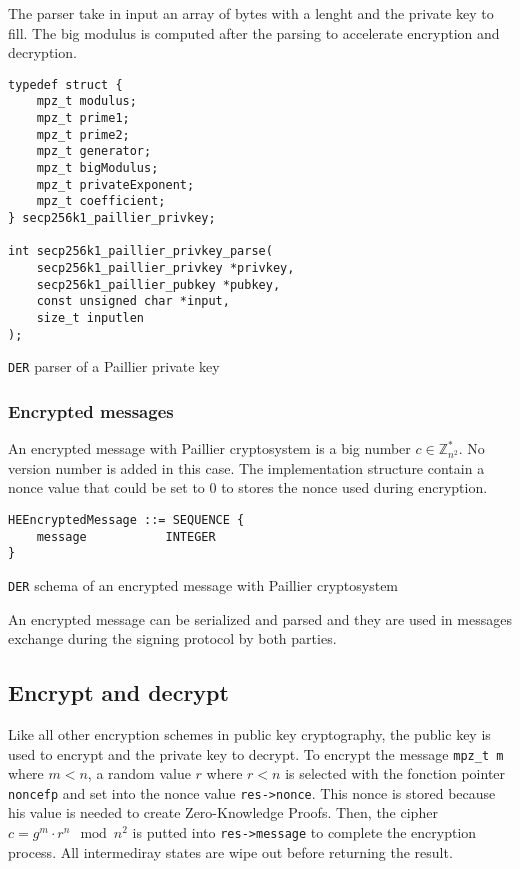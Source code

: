 The parser take in input an array of bytes with a lenght and the private key to fill.
The big modulus is computed after the parsing to accelerate encryption and decryption.

\begin{listing}
  \begin{verbatim}
typedef struct {
    mpz_t modulus;
    mpz_t prime1;
    mpz_t prime2;
    mpz_t generator;
    mpz_t bigModulus;
    mpz_t privateExponent;
    mpz_t coefficient;
} secp256k1_paillier_privkey;

int secp256k1_paillier_privkey_parse(
    secp256k1_paillier_privkey *privkey,
    secp256k1_paillier_pubkey *pubkey,
    const unsigned char *input,
    size_t inputlen
);
  \end{verbatim}
	\caption{\texttt{DER} parser of a Paillier private key}
	\label{lst:DERImplPaillierParsePriv}
\end{listing}

\subsubsection{Encrypted messages}

An encrypted message with Paillier cryptosystem is a big number $c \in \mathbb{Z}_{n^2}^*$.
No version number is added in this case.
The implementation structure contain a nonce value that could be set to 0
to stores the nonce used during encryption.

\begin{listing}
  \begin{verbatim}
HEEncryptedMessage ::= SEQUENCE {
    message           INTEGER
}
  \end{verbatim}
	\caption{\texttt{DER} schema of an encrypted message with Paillier cryptosystem}
	\label{lst:DERSchemaPaillierEncMessage}
\end{listing}

An encrypted message can be serialized and parsed and they are used in
messages exchange during the signing protocol by both parties.

\subsection{Encrypt and decrypt}

Like all other encryption schemes in public key cryptography, the public key is
used to encrypt and the private key to decrypt.
To encrypt the message \texttt{mpz\_t m} where $m < n$, a random value $r$ where
$r < n$ is selected with the fonction pointer \texttt{noncefp} and set into
the nonce value \texttt{res->nonce}. This nonce is stored because his value is
needed to create Zero-Knowledge Proofs. Then, the cipher $c = g^m \cdot r^n \mod n^2$
is putted into \texttt{res->message} to complete the encryption process. All intermediray
states are wipe out before returning the result.

